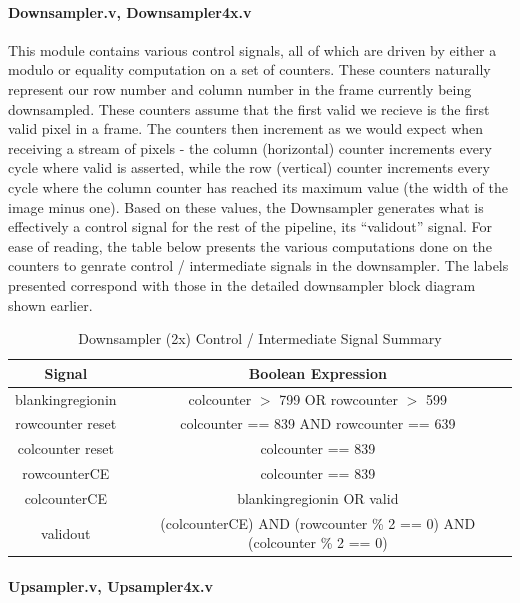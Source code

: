 \paragraph{Downsampler.v, Downsampler4x.v}
This module contains various control signals, all of which are driven by either
a modulo or equality computation on a set of counters. These counters naturally
represent our row number and column number in the frame currently being downsampled.
These counters assume that the first valid we recieve is the first valid pixel in a 
frame. The counters then increment as we would expect when receiving a stream of pixels - 
the column (horizontal) counter increments every cycle where valid is asserted, 
while the row (vertical) counter increments every cycle where the column counter
has reached its maximum value (the width of the image minus one). Based on these
values, the Downsampler generates what is effectively a control signal for the
rest of the pipeline, its ``validout'' signal. For ease of reading, the table
below presents the various computations done on the counters to genrate control / 
intermediate signals in the downsampler. The labels presented correspond with
those in the detailed downsampler block diagram shown earlier.

\begin{table}
    \tiny
\noindent \begin{tabular}{ c | c } \toprule
Signal & Boolean Expression \\\toprule
blankingregionin & colcounter $>$ 799 OR rowcounter $>$ 599 \\
rowcounter reset & colcounter == 839 AND rowcounter == 639 \\
colcounter reset & colcounter == 839 \\
rowcounterCE & colcounter == 839 \\
colcounterCE & blankingregionin OR valid \\
validout & (colcounterCE) AND (rowcounter \% 2 == 0) AND (colcounter \% 2 == 0) \\
\end{tabular}
\caption{ Downsampler (2x) Control / Intermediate Signal Summary } \label{wrap-tab:downsample}
\end{table}

\paragraph{Upsampler.v, Upsampler4x.v}

